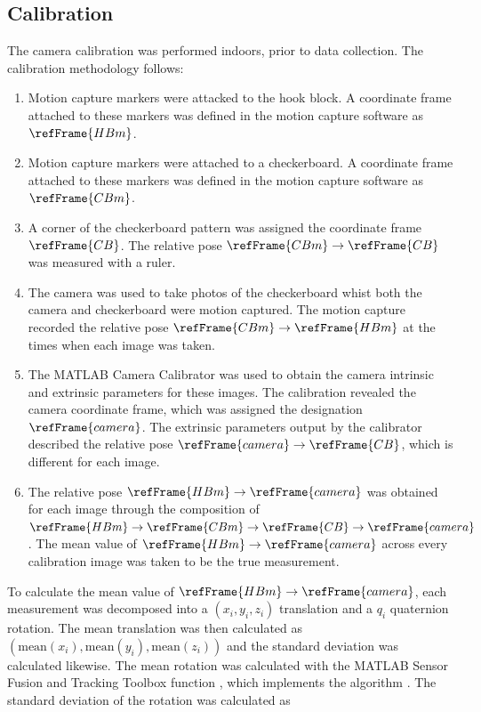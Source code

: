 \FloatBarrier
\subsection*{Calibration}
The camera calibration was performed indoors, prior to data collection. The calibration methodology follows:
\begin{enumerate}
    \item Motion capture markers were attacked to the hook block. A coordinate frame attached to these markers was defined in the motion capture software as $\refFrame{HBm}$.
    \item Motion capture markers were attached to a checkerboard. A coordinate frame attached to these markers was defined in the motion capture software as $\refFrame{CBm}$.
    \item A corner of the checkerboard pattern was assigned the coordinate frame $\refFrame{CB}$. The relative pose $\refFrame{CBm}\rightarrow\refFrame{CB}$ was measured with a ruler.
    \item The camera was used to take photos of the checkerboard whist both the camera and checkerboard were motion captured. The motion capture recorded the relative pose $\refFrame{CBm}\rightarrow\refFrame{HBm}$ at the times when each image was taken.
    \item The MATLAB Camera Calibrator was used to obtain the camera intrinsic and extrinsic parameters for these images. The calibration revealed the camera coordinate frame, which was assigned the designation $\refFrame{camera}$. The extrinsic parameters output by the calibrator described the relative pose $\refFrame{camera}\rightarrow\refFrame{CB}$, which is different for each image.
    \item The relative pose $\refFrame{HBm}\rightarrow\refFrame{camera}$ was obtained for each image through the composition of $\refFrame{HBm}\rightarrow\refFrame{CBm}\rightarrow\refFrame{CB}\rightarrow\refFrame{camera}$. The mean value of $\refFrame{HBm}\rightarrow\refFrame{camera}$ across every calibration image was taken to be the true measurement.
\end{enumerate}

To calculate the mean value of $\refFrame{HBm}\rightarrow\refFrame{camera}$, each measurement was decomposed into a $(x_i, y_i, z_i)$ translation and a $q_i$ quaternion rotation. The mean translation was then calculated as \\$(\text{mean}(x_i), \text{mean}(y_i), \text{mean}(z_i))$ and the standard deviation was calculated likewise. The mean rotation was calculated with the MATLAB Sensor Fusion and Tracking Toolbox function , which implements the algorithm \cite{BJ4-52}. The standard deviation of the rotation was calculated as

